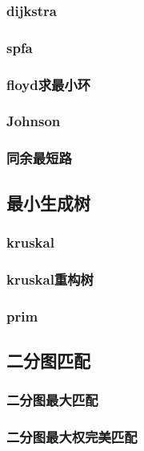\documentclass[a4paper,twocolumn]{article}
\begin{document}
\subsubsection{dijkstra}

\subsubsection{spfa}

\subsubsection{floyd求最小环}

\subsubsection{Johnson}

\subsubsection{同余最短路}

\subsection{最小生成树}
\subsubsection{kruskal}

\subsubsection{kruskal重构树}

\subsubsection{prim}

\subsection{二分图匹配}
\subsubsection{二分图最大匹配}

\subsubsection{二分图最大权完美匹配}

\end{document}
